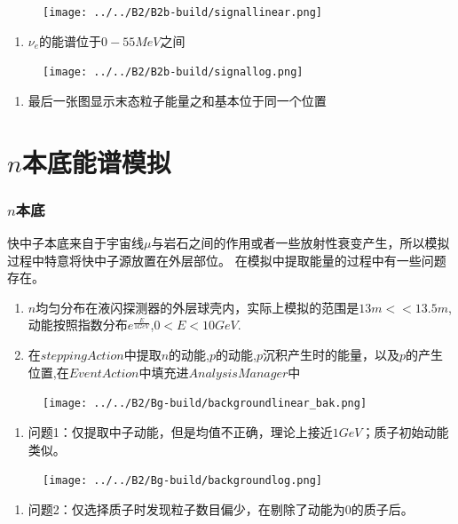 \documentclass{beamer}
\begin{document}
\begin{frame}
    \begin{figure}[h]
        \texttt{[image: ../../B2/B2b-build/signallinear.png]}
    \end{figure}
    \begin{enumerate}
        \item $\nu_e$的能谱位于$0-55MeV$之间
    \end{enumerate}
\end{frame}
\begin{frame}
    \begin{figure}[h]
        \texttt{[image: ../../B2/B2b-build/signallog.png]}
    \end{figure}
    \begin{enumerate}
        \item 最后一张图显示末态粒子能量之和基本位于同一个位置
    \end{enumerate}
\end{frame}
\section{$n$本底能谱模拟}
\begin{frame}
    \frametitle{$n$本底}
    快中子本底来自于宇宙线$\mu$与岩石之间的作用或者一些放射性衰变产生，所以模拟过程中特意将快中子源放置在外层部位。
    在模拟中提取能量的过程中有一些问题存在。
    \begin{enumerate}
        \item $n$均匀分布在液闪探测器的外层球壳内，实际上模拟的范围是$13m<<13.5m$,动能按照指数分布$e^{\frac{E}{1GeV}}$,$0<E<10GeV$.
        \item 在$steppingAction$中提取$n$的动能,$p$的动能,$p$沉积产生时的能量，以及$p$的产生位置,在$EventAction$中填充进$AnalysisManager$中
    \end{enumerate}
\end{frame}
\begin{frame}
    \begin{figure}[h]
        \texttt{[image: ../../B2/Bg-build/backgroundlinear\_bak.png]}
    \end{figure}
    \begin{enumerate}
        \item 问题1：仅提取中子动能，但是均值不正确，理论上接近$1GeV$；质子初始动能类似。
    \end{enumerate}
\end{frame}
\begin{frame}
    \begin{figure}[h]
        \texttt{[image: ../../B2/Bg-build/backgroundlog.png]}
    \end{figure}
    \begin{enumerate}
        \item 问题2：仅选择质子时发现粒子数目偏少，在剔除了动能为0的质子后。
    \end{enumerate}
\end{frame}
\end{document}
